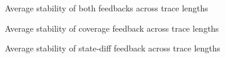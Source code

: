 \documentclass[twocolumn]{article}
\begin{document}
\begin{figure}
  \caption{Average stability of both feedbacks across trace lengths}
  \label{fig:both-inter}
\end{figure}
\begin{figure}
  \caption{Average stability of coverage feedback across trace lengths}
  \label{fig:cov-inter}
\end{figure}
\begin{figure}
  \caption{Average stability of state-diff feedback across trace lengths}
  \label{fig:state-diff-inter}
\end{figure}
\end{document}
